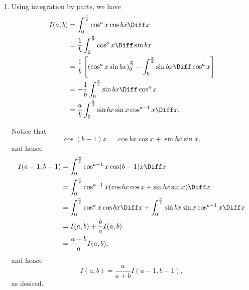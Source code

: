 \Question{\currfilebase}

\begin{enumerate}
    \item Using integration by parts, we have
          \begin{align*}
              I(a, b) & = \int_{0}^{\frac{\pi}{2}} \cos^a x \cos bx \Diff x                                                                             \\
                      & = \frac{1}{b} \int_{0}^{\frac{\pi}{2}} \cos^a x \Diff \sin bx                                                                   \\
                      & = \frac{1}{b} \left[\left(\cos^a x \sin bx\right)_{0}^{\frac{\pi}{2}} - \int_{0}^{\frac{\pi}{2}} \sin bx \Diff \cos^a x \right] \\
                      & = - \frac{1}{b} \int_{0}^{\frac{\pi}{2}} \sin bx \Diff \cos^a x                                                                 \\
                      & = \frac{a}{b} \int_{0}^{\frac{\pi}{2}} \sin bx \sin x \cos^{a - 1} x \Diff x.
          \end{align*}

          Notice that
          \[
              \cos (b - 1) x = \cos bx \cos x + \sin bx \sin x,
          \]
          and hence
          \begin{align*}
              I(a - 1, b - 1) & = \int_{0}^{\frac{\pi}{2}} \cos^{a - 1} x \cos (b - 1)x \Diff x                                                      \\
                              & = \int_{0}^{\frac{\pi}{2}} \cos^{a - 1} x (\cos bx \cos x + \sin bx \sin x) \Diff x                                  \\
                              & = \int_{0}^{\frac{\pi}{2}} \cos^a x \cos bx \Diff x + \int_{0}^{\frac{\pi}{2}} \sin bx \sin x \cos^{a - 1} x \Diff x \\
                              & = I(a, b) + \frac{b}{a} I(a, b)                                                                                      \\
                              & = \frac{a + b}{a} I(a, b),
          \end{align*}
          and hence
          \[
              I(a, b) = \frac{a}{a + b} I(a - 1, b - 1),
          \]
          as desired.


\end{enumerate}

